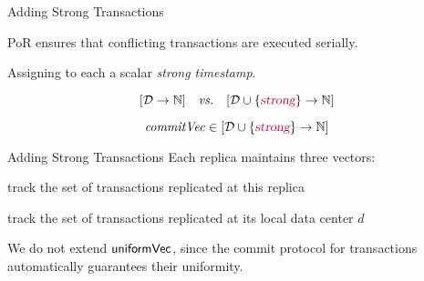 
\begin{frame}{Adding Strong Transactions}
  \begin{center}
    PoR ensures that conflicting transactions are executed serially.

    \pause
    \vspace{0.50cm}
    Assigning to each  a scalar \emph{strong timestamp}.
  \end{center}

  \pause
  \vspace{0.30cm}
  \[
    [\mathcal{D} \to \mathbb{N}] \quad\text{\emph{vs.}}\quad [\mathcal{D} \cup \{\textcolor{purple}{\textsl{strong}}\} \to \mathbb{N}]
  \]

  \pause
  \[
    \mathit{commitVec} \in [\mathcal{D} \cup \{\textcolor{purple}{\textsl{strong}}\} \to \mathbb{N}]
  \]
\end{frame}

\begin{frame}{Adding Strong Transactions}
  Each replica maintains three vectors: \\[5pt]

  \begin{description} %
    \setlength{\itemsep}{10pt}
    \item[$\knownVC\text{[\strongcolor{\strongentry}]}$:] track the set of  transactions replicated at this replica
    \item[$\stableVC\text{[\strongcolor{\strongentry}]}$:] track the set of  transactions replicated at its local data center $d$
    \item[$\uniformVC$:] We do not extend $\uniformVC$, since the commit protocol for
       transactions automatically guarantees their uniformity.
  \end{description}
\end{frame}


